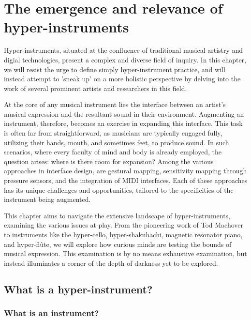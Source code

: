 \documentclass[12pt,twoside,maitrise]{dms_ks}
\theoremstyle{definition}
\begin{document}

\chapter{The emergence and relevance of hyper-instruments}

Hyper-instruments, situated at the confluence of traditional musical artistry and digial technologies, present a complex and diverse field of inquiry.
In this chapter, we will resist the urge to define simply hyper-instrument practice, and will instead attempt to 'sneak up' on a more holistic perspective by delving into the work of several prominent artists and researchers in this field.

At the core of any musical instrument lies the interface between an artist's musical expression and the resultant sound in their environment.
Augmenting an instrument, therefore, becomes an exercise in expanding this interface.
This task is often far from straightforward, as musicians are typically engaged fully, utilizing their hands, mouth, and sometimes feet, to produce sound.
In such scenarios, where every faculty of mind and body is already employed, the question arises: where is there room for expansion?
Among the various approaches in interface design, are gestural mapping, sensitivity mapping through pressure sensors, and the integration of MIDI interfaces.
Each of these approaches has its unique challenges and opportunities, tailored to the specificities of the instrument being augmented.

This chapter aims to navigate the extensive landscape of hyper-instruments, examining the various issues at play.
From the pioneering work of Tod Machover to instruments like the hyper-cello, hyper-shakuhachi, magnetic resonator piano, and hyper-flûte, we will explore how curious minds are testing the bounds of musical expression.
This examination is by no means exhaustive examination, but instead illuminates a corner of the depth of darkness yet to be explored. 

\section{What is a hyper-instrument?}

\subsection{What is an instrument?}
\end{document}
